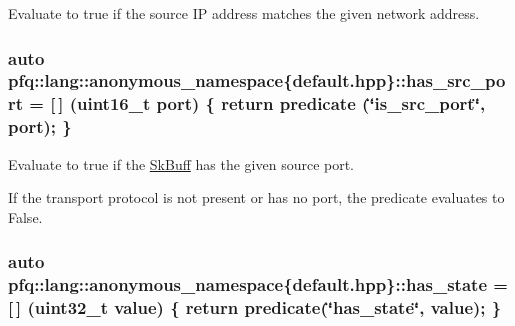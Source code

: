 Evaluate to {\ttfamily true} if the source IP address matches the given network address. 

\subsubsection[{\texorpdfstring{has\+\_\+src\+\_\+port}{has_src_port}}]{\setlength{\rightskip}{0pt plus 5cm}auto pfq\+::lang\+::anonymous\+\_\+namespace\{default.\+hpp\}\+::has\+\_\+src\+\_\+port = \mbox{[}$\,$\mbox{]} (uint16\+\_\+t {\bf port}) \{ return {\bf predicate} (\char`\"{}is\+\_\+src\+\_\+port\char`\"{}, port); \}}\hypertarget{namespacepfq_1_1lang_1_1anonymous__namespace_02default_8hpp_03_a964d5ed41f50a1f3a04176f8e54d7a5a}{}\label{namespacepfq_1_1lang_1_1anonymous__namespace_02default_8hpp_03_a964d5ed41f50a1f3a04176f8e54d7a5a}


Evaluate to {\ttfamily true} if the \hyperlink{structpfq_1_1lang_1_1SkBuff}{Sk\+Buff} has the given source port. 

If the transport protocol is not present or has no port, the predicate evaluates to False. 
\subsubsection[{\texorpdfstring{has\+\_\+state}{has_state}}]{\setlength{\rightskip}{0pt plus 5cm}auto pfq\+::lang\+::anonymous\+\_\+namespace\{default.\+hpp\}\+::has\+\_\+state = \mbox{[}$\,$\mbox{]} (uint32\+\_\+t value) \{ return {\bf predicate}(\char`\"{}has\+\_\+state\char`\"{}, value); \}}\hypertarget{namespacepfq_1_1lang_1_1anonymous__namespace_02default_8hpp_03_a8efacc41a17e01f17a25e8fc1d784c74}{}\label{namespacepfq_1_1lang_1_1anonymous__namespace_02default_8hpp_03_a8efacc41a17e01f17a25e8fc1d784c74}


